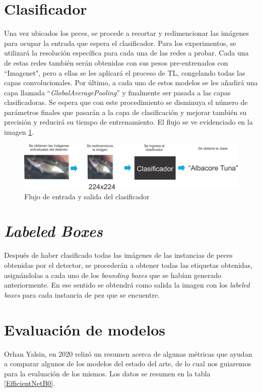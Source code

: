 \section{Clasificador}
Una vez ubicados los peces, se procede a recortar y redimencionar las imágenes para ocupar la entrada que espera el clasificador. Para los experimentos, se utilizará la resolución específica para cada una de las redes a probar. Cada una de estas redes también serán obtenidas con sus pesos pre-entrenados con ``Imagenet", pero a ellas se les aplicará el proceso de TL, congelando todas las capas convolucionales. Por último, a cada uno de estos modelos se les añadirá una capa llamada ``\textit{GlobalAveragePooling}'' y finalmente ser pasada a las capas clasificadoras. Se espera que con este procedimiento se disminuya el número de parámetros finales que pasarán a la capa de clasificación y mejorar también su precisión y reducirá su tiempo de entrenamiento. El flujo se ve evidenciado en la imagen \ref{fig:clasificador_pez}.
\begin{figure}[h!]
\includegraphics[width=1\textwidth]{images/clasificador_label.png}
\caption{Flujo de entrada y salida del clasificador }
\label{fig:clasificador_pez}
\end{figure}

\section{\textit{Labeled Boxes}}
Después de haber clasificado todas las imágenes de las instancias de peces obtenidas por el detector, se procederán a obtener todas las etiquetas obtenidas, asignándolas a cada uno de los \textit{bounding boxes} que se habían generado anteriormente. En ese sentido se obtendrá como salida la imagen con los \textit{labeled boxes} para cada instancia de pez que se encuentre. 

\section{Evaluación de modelos}

Orhan Yalsin, en 2020 relizó un resumen acerca de algunas métricas que ayudan a comparar algunos de los modelos del estado del arte, de lo cual nos guiaremos para la evaluación de los mismos. Los datos se resumen en la tabla \ref{EfficientNetB0}.

